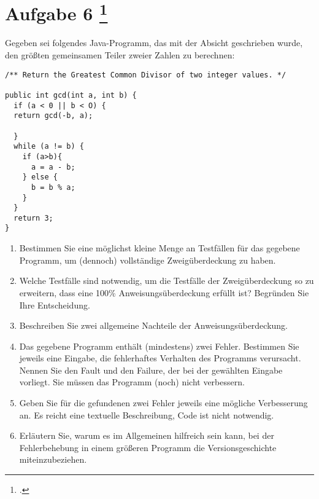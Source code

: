 \documentclass{lehramt-informatik-aufgabe}
\begin{document}
\liAufgabenTitel{}
\section{Aufgabe 6
\footcite{examen:66116:2020:09}}

Gegeben sei folgendes Java-Programm, das mit der Absicht geschrieben
wurde, den größten gemeinsamen Teiler zweier Zahlen zu berechnen:

\begin{verbatim}
/** Return the Greatest Common Divisor of two integer values. */

public int gcd(int a, int b) {
  if (a < 0 || b < O) {
  return gcd(-b, a);

  }
  while (a != b) {
    if (a>b){
      a = a - b;
    } else {
      b = b % a;
    }
  }
  return 3;
}
\end{verbatim}

\begin{enumerate}


\item Bestimmen Sie eine möglichst kleine Menge an Testfällen für das
gegebene Programm, um (dennoch) vollständige Zweigüberdeckung zu haben.


\item Welche Testfälle sind notwendig, um die Testfälle der
Zweigüberdeckung so zu erweitern, dass eine 100\% Anweisungsüberdeckung
erfüllt ist? Begründen Sie Ihre Entscheidung.


\item Beschreiben Sie zwei allgemeine Nachteile der
Anweisungsüberdeckung.


\item Das gegebene Programm enthält (mindestens) zwei Fehler. Bestimmen
Sie jeweils eine Eingabe, die fehlerhaftes Verhalten des Programms
verursacht. Nennen Sie den Fault und den Failure, der bei der gewählten
Eingabe vorliegt. Sie müssen das Programm (noch) nicht verbessern.


\item Geben Sie für die gefundenen zwei Fehler jeweils eine mögliche
Verbesserung an. Es reicht eine textuelle Beschreibung, Code ist nicht
notwendig.


\item Erläutern Sie, warum es im Allgemeinen hilfreich sein kann, bei
der Fehlerbehebung in einem größeren Programm die Versionsgeschichte
miteinzubeziehen.
\end{enumerate}
\end{document}
